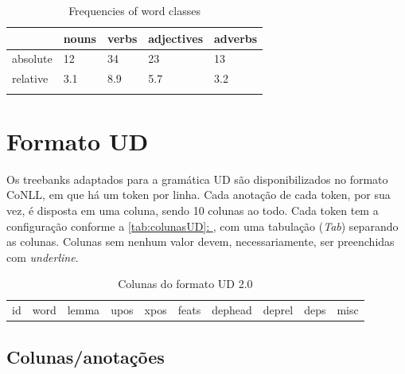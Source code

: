 \documentclass[output=paper,colorlinks,citecolor=brown]{langscibook}
\newcommand*{\fullref}[1]{\hyperref[{#1}]{\autoref*{#1}: \nameref*{#1}}} %
\begin{document}
\begin{table}
    \caption{Frequencies of word classes}
    \label{tab:1:frequencies}
    \begin{tabular}{lllll} 
        \lsptoprule
        & nouns & verbs & adjectives & adverbs\\ 
        \midrule
        absolute  &   12 &    34  &    23     & 13\\
        relative  &   3.1 &   8.9 &    5.7    & 3.2\\
        \lspbottomrule
    \end{tabular}
\end{table}

\section{Formato UD}\label{sec:formatoud}

Os treebanks adaptados para a gramática UD são disponibilizados no formato CoNLL, em que há um token por linha. Cada anotação de cada token, por sua vez, é disposta em uma coluna, sendo 10 colunas ao todo. Cada token tem a configuração conforme a \fullref{tab:colunasUD}, com uma tabulação (\textit{Tab}) separando as colunas. Colunas sem nenhum valor devem, necessariamente, ser preenchidas com \textit{underline}.

\begin{table}
    \centering
    \begin{tabular}{c c c c c c c c c c}
        id & word & lemma & upos & xpos & feats & dephead & deprel & deps & misc\\
    \end{tabular}
    \caption{Colunas do formato UD 2.0}
    \label{tab:colunasUD}
\end{table}

\subsection{Colunas/anotações}\label{sec:colunas}
\end{document}
